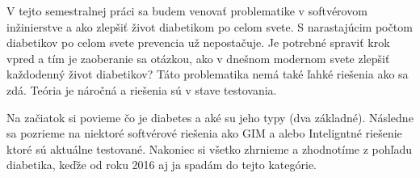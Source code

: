 V tejto semestralnej práci sa budem venovať problematike v softvérovom inžinierstve a ako zlepšiť život diabetikom po celom svete. S narastajúcim počtom diabetikov po celom svete prevencia už nepostačuje.
Je potrebné spraviť krok vpred a tím je zaoberanie sa otázkou, ako v dnešnom modernom svete zlepšiť každodenný život diabetikov? 
Táto problematika nemá také ľahké riešenia ako sa zdá. Teória je náročná a riešenia sú v stave testovania.

Na začiatok si povieme čo je diabetes a aké su jeho typy (dva základné). Následne sa pozrieme na niektoré softvérové riešenia ako GIM a alebo Inteligntné riešenie ktoré sú aktuálne testované.
Nakoniec si všetko zhrnieme a zhodnotíme z pohľadu diabetika, keďže od roku 2016 aj ja spadám do tejto kategórie. 




